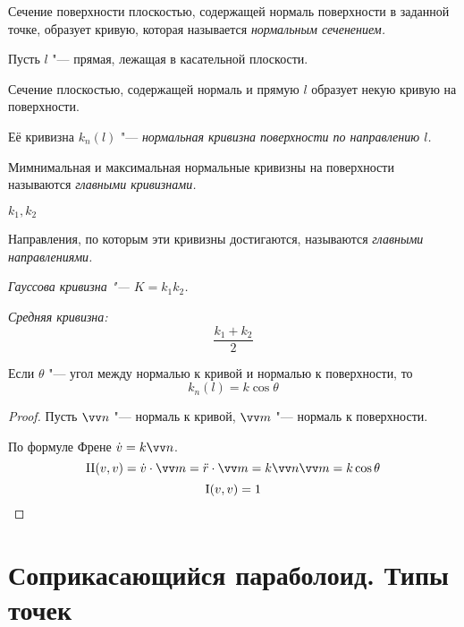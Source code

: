 \begin{definition}
	Сечение поверхности плоскостью, содержащей нормаль поверхности в заданной точке, образует кривую, которая называется \it{нормальным сеченением}.
\end{definition}

\begin{definition}
	Пусть $ l $ "--- прямая, лежащая в касательной плоскости.

	Сечение плоскостью, содержащей нормаль и прямую $ l $ образует некую кривую на поверхности.

	Её кривизна $ k_n(l) $ "--- \it{нормальная кривизна} поверхности по направлению $ l $.
\end{definition}

\begin{definition}
	Мимнимальная и максимальная нормальные кривизны на поверхности называются \it{главными кривизнами}.
\end{definition}

\begin{notation}
	$ k_1, k_2 $
\end{notation}

\begin{definition}
	Направления, по которым эти кривизны достигаются, называются \it{главными направлениями}.
\end{definition}

\begin{definition}
	\it{Гауссова кривизна} "--- $ K = k_1k_2 $.
\end{definition}

\begin{definition}
	\it{Средняя кривизна}:
	$$ \frac{k_1 + k_2}2 $$
\end{definition}

\begin{theorem}[Мёнье]
	Если $ \theta $ "--- угол между нормалью к кривой и нормалью к поверхности, то
	$$ k_n(l) = k\cos \theta $$
\end{theorem}

\begin{proof}
	Пусть $ \vv n $ "--- нормаль к кривой, $ \vv m $ "--- нормаль к поверхности.

	По  формуле Френе $ \dot v = k \vv n $.
	$$ \rom2(v, v) = \dot v \cdot \vv m = \ddot r \cdot \vv m = k \vv n \vv m = k \cos \theta $$
	$$ \rom1(v, v) = 1 $$
\end{proof}

\section{Соприкасающийся параболоид. Типы точек}

